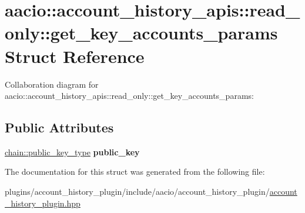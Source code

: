 \hypertarget{structaacio_1_1account__history__apis_1_1read__only_1_1get__key__accounts__params}{}\section{aacio\+:\+:account\+\_\+history\+\_\+apis\+:\+:read\+\_\+only\+:\+:get\+\_\+key\+\_\+accounts\+\_\+params Struct Reference}
\label{structaacio_1_1account__history__apis_1_1read__only_1_1get__key__accounts__params}


Collaboration diagram for aacio\+:\+:account\+\_\+history\+\_\+apis\+:\+:read\+\_\+only\+:\+:get\+\_\+key\+\_\+accounts\+\_\+params\+:
\subsection*{Public Attributes}
\begin{DoxyCompactItemize}
\item 
\mbox{\label{structaacio_1_1account__history__apis_1_1read__only_1_1get__key__accounts__params_ac0653a55d15a3e4f46ce31ac15184803}} 
\mbox{\hyperlink{classfc_1_1crypto_1_1public__key}{chain\+::public\+\_\+key\+\_\+type}} {\bfseries public\+\_\+key}
\end{DoxyCompactItemize}


The documentation for this struct was generated from the following file\+:\begin{DoxyCompactItemize}
\item 
plugins/account\+\_\+history\+\_\+plugin/include/aacio/account\+\_\+history\+\_\+plugin/\mbox{\hyperlink{account__history__plugin_8hpp}{account\+\_\+history\+\_\+plugin.\+hpp}}\end{DoxyCompactItemize}
